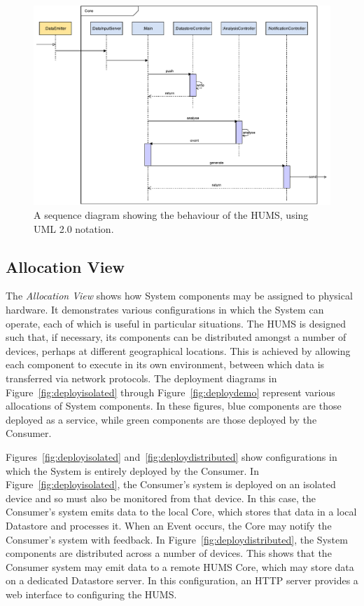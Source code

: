 \documentclass[10pt,a4paper]{article}
\begin{document}
\begin{figure}[h]
  \centering
  \includegraphics[width=\textwidth]{images/behaviourView.pdf}
  \caption{A sequence diagram showing the behaviour of the HUMS, using UML 2.0 notation.}
  \label{fig:sequence}
\end{figure}

\subsection{Allocation View}

The \emph{Allocation View} shows how System components may be assigned to physical hardware. It demonstrates various configurations in which the System can operate, each of which is useful in particular situations. The HUMS is designed such that, if necessary, its components can be distributed amongst a number of devices, perhaps at different geographical locations. This is achieved by allowing each component to execute in its own environment, between which data is transferred via network protocols. The deployment diagrams in Figure~\ref{fig:deployisolated} through Figure~\ref{fig:deploydemo} represent various allocations of System components. In these figures, blue components are those deployed as a service, while green components are those deployed by the Consumer.

Figures~\ref{fig:deployisolated} and~\ref{fig:deploydistributed} show configurations in which the System is entirely deployed by the Consumer. In Figure~\ref{fig:deployisolated}, the Consumer's system is deployed on an isolated device and so must also be monitored from that device. In this case, the Consumer's system emits data to the local Core, which stores that data in a local Datastore and processes it. When an Event occurs, the Core may notify the Consumer's system with feedback. In Figure~\ref{fig:deploydistributed}, the System components are distributed across a number of devices. This shows that the Consumer system may emit data to a remote HUMS Core, which may store data on a dedicated Datastore server. In this configuration, an HTTP server provides a web interface to configuring the HUMS.
\end{document}
